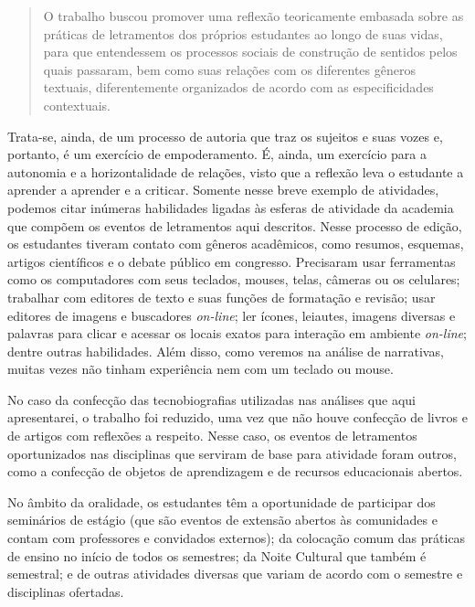 \documentclass{textolivre}
\begin{document}
\begin{quote}
    O trabalho buscou promover uma reflexão teoricamente embasada sobre as práticas de letramentos dos próprios estudantes ao longo de suas vidas, para que entendessem os processos sociais de construção de sentidos pelos quais passaram, bem como suas relações com os diferentes gêneros textuais, diferentemente organizados de acordo com as especificidades contextuais.
\end{quote}

Trata-se, ainda, de um processo de autoria que traz os sujeitos e suas vozes e, portanto, é um exercício de empoderamento. É, ainda, um exercício para a autonomia e a horizontalidade de relações, visto que a reflexão leva o estudante a aprender a aprender e a criticar. Somente nesse breve exemplo de atividades, podemos citar inúmeras habilidades ligadas às esferas de atividade da academia que compõem os eventos de letramentos aqui descritos. Nesse processo de edição, os estudantes tiveram contato com gêneros acadêmicos, como resumos, esquemas, artigos científicos e o debate público em congresso. Precisaram usar ferramentas como os computadores com seus teclados, mouses, telas, câmeras ou os celulares; trabalhar com editores de texto e suas funções de formatação e revisão; usar editores de imagens e buscadores \textit{on-line}; ler ícones, leiautes, imagens diversas e palavras para clicar e acessar os locais exatos para interação em ambiente \textit{on-line}; dentre outras habilidades. Além disso, como veremos na análise de narrativas, muitas vezes não tinham experiência nem com um teclado ou mouse.

No caso da confecção das tecnobiografias utilizadas nas análises que aqui apresentarei, o trabalho foi reduzido, uma vez que não houve confecção de livros e de artigos com reflexões a respeito. Nesse caso, os eventos de letramentos oportunizados nas disciplinas que serviram de base para atividade foram outros, como a confecção de objetos de aprendizagem e de recursos educacionais abertos.

No âmbito da oralidade, os estudantes têm a oportunidade de participar dos seminários de estágio (que são eventos de extensão abertos às comunidades e contam com professores e convidados externos); da colocação comum das práticas de ensino no início de todos os semestres; da Noite Cultural que também é semestral; e de outras atividades diversas que variam de acordo com o semestre e disciplinas ofertadas.
\end{document}

